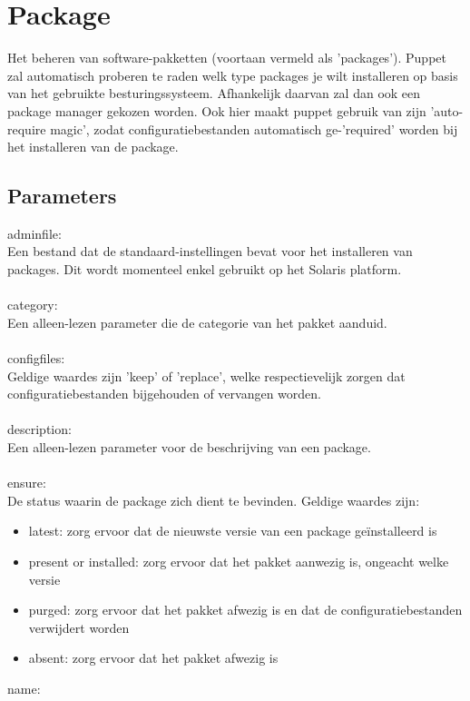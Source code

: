 \section{Package}

Het beheren van software-pakketten (voortaan vermeld als 'packages'). Puppet zal automatisch proberen te raden welk type packages je wilt installeren op basis van het gebruikte besturingssysteem. Afhankelijk daarvan zal dan ook een package manager gekozen worden. Ook hier maakt puppet gebruik van zijn 'auto-require magic', zodat configuratiebestanden automatisch ge-'required' worden bij het installeren van de package.

\subsection{Parameters}
%
adminfile:\\
Een bestand dat de standaard-instellingen bevat voor het installeren van packages. Dit wordt momenteel enkel gebruikt op het Solaris platform.\\\\
%
category:\\
Een alleen-lezen parameter die de categorie van het pakket aanduid.\\\\
%
configfiles:\\
Geldige waardes zijn 'keep' of 'replace', welke respectievelijk zorgen dat configuratiebestanden bijgehouden of vervangen worden.\\\\
%
description:\\
Een alleen-lezen parameter voor de beschrijving van een package.\\\\
%
ensure:\\
De status waarin de package zich dient te bevinden. Geldige waardes zijn:
\begin{itemize}
\item latest: zorg ervoor dat de nieuwste versie van een package ge\"installeerd is
\item present or installed: zorg ervoor dat het pakket aanwezig is, ongeacht welke versie
\item purged: zorg ervoor dat het pakket afwezig is en dat de configuratiebestanden verwijdert worden
\item absent: zorg ervoor dat het pakket afwezig is
\end{itemize}
%
name:\\
